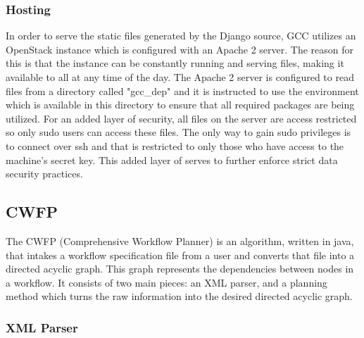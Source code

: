 \documentclass[fleqn,10pt]{SelfArx} %
\begin{document}
\subsubsection{Hosting}

In order to serve the static files generated by the Django source, GCC utilizes an OpenStack instance which is configured with an Apache 2 server. The reason for this is that the instance can be constantly running and serving files, making it available to all at any time of the day. The Apache 2 server is configured to read files from a directory called "gcc\_dep" and it is instructed to use the environment which is available in this directory to ensure that all required packages are being utilized. For an added layer of security, all files on the server are access restricted so only sudo users can access these files. The only way to gain sudo privileges is to connect over ssh and that is restricted to only those who have access to the machine’s secret key. This added layer of serves to further enforce strict data security practices.

\subsection{CWFP}

The CWFP (Comprehensive Workflow Planner) is an algorithm, written in java, that intakes a workflow specification file from a user and converts that file into a directed acyclic graph. This graph represents the dependencies between nodes in a workflow. It consists of two main pieces: an XML parser, and a planning method which turns the raw information into the desired directed acyclic graph.

\subsubsection{XML Parser}
\end{document}
